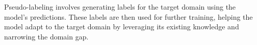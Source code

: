 Pseudo-labeling involves generating labels for the target domain using the model's predictions. These labels are then used for further training, helping the model adapt to the target domain by leveraging its existing knowledge and narrowing the domain gap.

